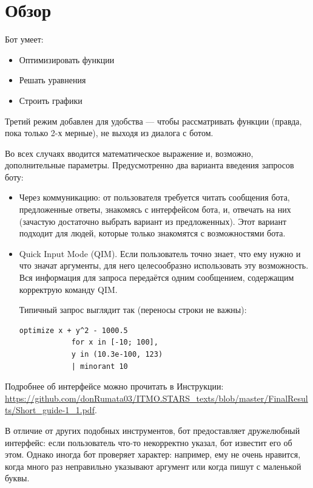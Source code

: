 \documentclass[11pt]{article}
\begin{document}
    \section{Обзор}\label{sec:overview}

    Бот умеет:
    \begin{itemize}
        \item Оптимизировать функции
        \item Решать уравнения
        \item Строить графики
    \end{itemize}

    Третий режим добавлен для удобства — чтобы рассматривать функции (правда, пока только 2-х мерные),
    не выходя из диалога с ботом.

    Во всех случаях вводится математическое выражение и, возможно, дополнительные параметры.
    Предусмотренно два варианта введения запросов боту:
    \begin{itemize}
        \item Через коммуникацию: от пользователя требуется читать сообщения бота, предложенные ответы, знакомясь с интерфейсом бота,
              и, отвечать на них (зачастую достаточно выбрать вариант из предложенных).
              Этот вариант подходит для людей, которые только знакомятся с возможностями бота.
        \item Quick Input Mode (QIM).
              Если пользователь точно знает, что ему нужно и что значат аргументы, для него целесообразно использовать эту возможность.
              Вся информация для запроса передаётся одним сообщением, содержащим корректрую команду QIM.

        Типичный запрос выглядит так (переносы строки не важны): \newline

        \begin{lstlisting}[label={lst:QIM-example}]
            optimize x + y^2 - 1000.5
            for x in [-10; 100],
            y in (10.3e-100, 123)
            | minorant 10
        \end{lstlisting}

    \end{itemize}

    Подробнее об интерфейсе можно прочитать в Инструкции: \url{https://github.com/donRumata03/ITMO.STARS_texts/blob/master/FinalResults/Short_guide-1_1.pdf}.


    В отличие от других подобных инструментов, бот предоставляет дружелюбный интерфейс: если пользователь что-то некорректно указал,
    бот известит его об этом.
    Однако иногда бот проверяет характер: например, ему не очень нравится, когда много раз неправильно указывают аргумент или
    когда пишут с маленькой буквы.
\end{document}
